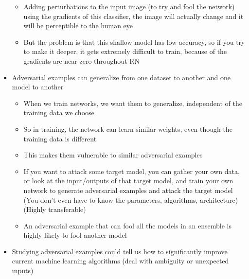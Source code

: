 \begin{itemize}
\begin{itemize}
 		\item Adding perturbations to the input image (to try and fool the network) using the gradients of this classifier, the image will actually change and it will be perceptible to the human eye
 		\item But the problem is that this shallow model has low accuracy, so if you try to make it deeper, it gets extremely difficult to train, because of the gradients are near zero throughout RN
 	\end{itemize}
	\item Adversarial examples can generalize from one dataset to another and one model to another
	\begin{itemize}
		\item When we train networks, we want them to generalize, independent of the training data we choose
		\item So in training, the network can learn similar weights, even though the training data is different
		\item This makes them vulnerable to similar adversarial examples
		\item If you want to attack some target model, you can gather your own data, or look at the input/outputs of that target model, and train your own network to generate adversarial examples and attack the target model (You don't even have to know the parameters, algorithms, architecture) (Highly transferable)
		\item An adversarial example that can fool all the models in an ensemble is highly likely to fool another model
	\end{itemize}
	\item Studying adversarial examples could tell us how to significantly improve current machine learning algorithms (deal with ambiguity or unexpected inputs)
\end{itemize}

